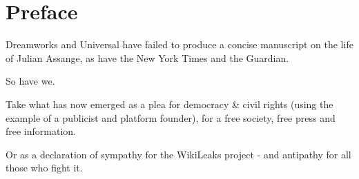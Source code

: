 



\renewcommand{\thechapter}{\Roman{chapter}}
\renewcommand{\thesection}{\Roman{section}}
\addtolength{\cftsecnumwidth}{10pt}
\addtolength{\cftchapnumwidth}{10pt}

\pagecolor{assangered}\afterpage{\nopagecolor}
\afterpage{\restorepagecolor}

\color{white} %
\maketitle %

\pagecolor{assangered}\afterpage{\nopagecolor}
\chapter*{Preface}
\thispagestyle{empty} %
\begin{Large}
Dreamworks and Universal have failed to produce a concise manuscript on the life of Julian Assange, as have the New York Times and the Guardian.

So have we.

Take what has now emerged as a plea for democracy \& civil rights (using the example of a publicist and platform founder), for a free society, free press and free information.

Or as a declaration of sympathy for the WikiLeaks project - and antipathy for all those who fight it.
\end{Large}


